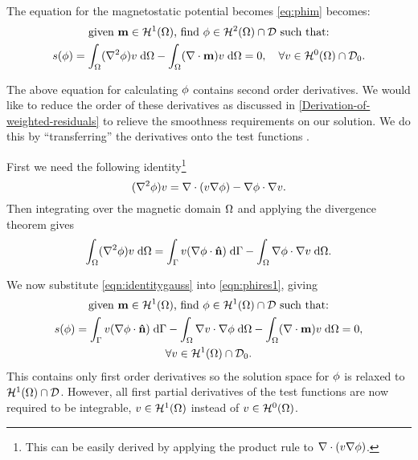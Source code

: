 The equation for the magnetostatic potential becomes \eqref{eq:phim} becomes:
\begin{gather}
  \text{given $\mathbf{m} \in \mathcal{H}^1(\Omega)$, find $\phi \in \mathcal{H}^2(\Omega) \cap \mathcal{D}$ such that:} \notag \\
  s(\phi) = \int_\Omega (\nabla^2 \phi) v  {\; \text{d}} \Omega
  - \int_\Omega (\nabla \cdot \mathbf{m}) v {\; \text{d}} \Omega = 0,
  \quad \forall v \in \mathcal{H}^0(\Omega) \cap \mathcal{D}_0. \label{eqn:phires1}
\end{gather}

The above equation for calculating $\phi$ contains second order derivatives.
We would like to reduce the order of these derivatives as discussed in \autoref{Derivation-of-weighted-residuals} to relieve the smoothness requirements on our solution.
We do this by ``transferring'' the derivatives onto the test functions \cite{HowardElmanDavidSilvester2006}.

First we need the following identity\footnote{This can be easily derived by applying the product rule to $\nabla \cdot (v \nabla \phi)$.}
\begin{equation}
  (\nabla^2 \phi) v =
  \nabla \cdot (v \nabla \phi)
  - \nabla \phi \cdot \nabla v.
  \label{eq:20}
\end{equation}
Then integrating over the magnetic domain $\Omega$ and applying the divergence theorem gives
\begin{equation}
  \int_\Omega (\nabla^2 \phi) v {\; \text{d}} \Omega =
  \int_{{\Gamma}} v (\nabla \phi \cdot \mathbf{\hat{n}}) {\; \text{d}} {\Gamma}
  - \int_\Omega \nabla \phi \cdot \nabla v {\; \text{d}} \Omega.
  \label{eqn:identitygauss}
\end{equation}

We now substitute \eqref{eqn:identitygauss} into \eqref{eqn:phires1}, giving
\begin{gather}
  \text{given $\mathbf{m} \in \mathcal{H}^1(\Omega)$, find $\phi \in \mathcal{H}^1(\Omega) \cap \mathcal{D}$ such that:} \notag \\
  s(\phi) = \int_{{\Gamma}} v (\nabla \phi \cdot \mathbf{\hat{n}}) {\; \text{d}} {\Gamma}
  - \int_\Omega \nabla v \cdot \nabla \phi {\; \text{d}} \Omega
  - \int_\Omega (\nabla \cdot \mathbf{m}) v {\; \text{d}} \Omega = 0
  , \notag \\
  \forall v \in \mathcal{H}^1(\Omega) \cap \mathcal{D}_0. \notag
\end{gather}
This contains only first order derivatives so the solution space for $\phi$ is relaxed to $\mathcal{H}^1(\Omega) \cap \mathcal{D}$. However, all first partial derivatives of the test functions are now required to be integrable, \ie $v \in \mathcal{H}^1(\Omega)$ instead of $v \in \mathcal{H}^0(\Omega)$.

